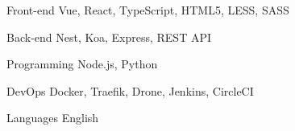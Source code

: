 

\begin{cvskills}


  \cvskill
  {Front-end} %
  {Vue, React, TypeScript, HTML5, LESS, SASS} %

  \cvskill
    {Back-end} %
    {Nest, Koa, Express, REST API} %

  \cvskill
    {Programming} %
    {Node.js, Python} %

\cvskill
  {DevOps} %
  {Docker, Traefik, Drone, Jenkins, CircleCI} %

  \cvskill
    {Languages} %
    {English} %

\end{cvskills}
